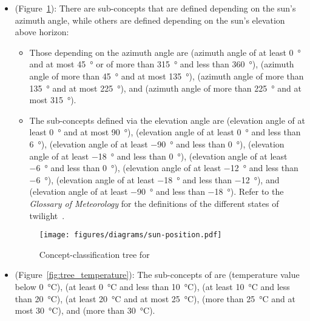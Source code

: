 \begin{itemize}
  \item {} (Figure~\ref{fig:tree_sun_position}): There are sub-concepts that are defined depending on the sun's azimuth angle, while others are defined depending on the sun's elevation above horizon:
    \begin{itemize}
      \item Those depending on the azimuth angle are  (azimuth angle of at least \SI{0}{\degree} and at most \SI{45}{\degree} or of more than \SI{315}{\degree} and less than \SI{360}{\degree}),  (azimuth angle of more than \SI{45}{\degree} and at most \SI{135}{\degree}),  (azimuth angle of more than \SI{135}{\degree} and at most \SI{225}{\degree}), and  (azimuth angle of more than \SI{225}{\degree} and at most \SI{315}{\degree}).
      
      \item The sub-concepts defined via the elevation angle are  (elevation angle of at least \SI{0}{\degree} and at most \SI{90}{\degree}),  (elevation angle of at least \SI{0}{\degree} and less than \SI{6}{\degree}),  (elevation angle of at least \SI{-90}{\degree} and less than \SI{0}{\degree}),  (elevation angle of at least \SI{-18}{\degree} and less than \SI{0}{\degree}),  (elevation angle of at least \SI{-6}{\degree} and less than \SI{0}{\degree}),  (elevation angle of at least \SI{-12}{\degree} and less than \SI{-6}{\degree}),  (elevation angle of at least \SI{-18}{\degree} and less than \SI{-12}{\degree}), and  (elevation angle of at least \SI{-90}{\degree} and less than \SI{-18}{\degree}). Refer to the \emph{Glossary of Meteorology} for the definitions of the different states of twilight~\cite{GlossaryOfMeteorology}.
    \end{itemize}
  
  \begin{figure}
    \centering
    \texttt{[image: figures/diagrams/sun-position.pdf]}
    \caption{Concept-classification tree for }
    \label{fig:tree_sun_position}
  \end{figure}

  \item {} (Figure~\ref{fig:tree_temperature}): The sub-concepts of  are  (temperature value below \SI{0}{\celsius}),  (at least \SI{0}{\celsius} and less than \SI{10}{\celsius}),  (at least \SI{10}{\celsius} and less than \SI{20}{\celsius}),  (at least \SI{20}{\celsius} and at most \SI{25}{\celsius}),  (more than \SI{25}{\celsius} and at most \SI{30}{\celsius}), and  (more than \SI{30}{\celsius}).
  

\end{itemize}
